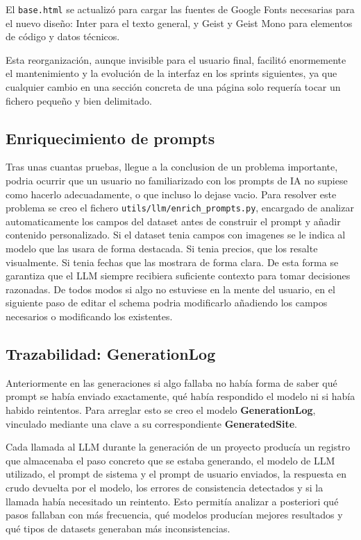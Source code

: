 El \texttt{base.html} se actualizó para cargar las fuentes de Google Fonts 
necesarias para el nuevo diseño: Inter para el texto general, 
y Geist y Geist Mono para elementos de código y datos técnicos.

Esta reorganización, aunque invisible para el usuario final, facilitó enormemente el mantenimiento y la evolución de la interfaz en los sprints siguientes, ya que cualquier cambio en una sección concreta de una página solo requería tocar un fichero pequeño y bien delimitado.


\subsection{Enriquecimiento de prompts}
\label{subsec:enriquecimiento-prompts}

Tras unas cuantas pruebas, llegue a la conclusion de un problema importante, podria ocurrir que un usuario no familiarizado con los prompts de IA no supiese como hacerlo adecuadamente, o que incluso lo dejase vacio. Para resolver este problema se creo el fichero \texttt{utils/llm/enrich\_prompts.py}, 
encargado de analizar automaticamente los campos del dataset antes de construir el prompt y añadir contenido personalizado.
Si el dataset tenia campos con imagenes se le indica al modelo que las usara de forma destacada. Si tenia precios, que los resalte visualmente. Si tenia
fechas que las mostrara de forma clara. De esta forma se garantiza que el LLM siempre recibiera suficiente contexto para tomar decisiones razonadas.
De todos modos si algo no estuviese en la mente del usuario, en el siguiente paso de editar el schema podria modificarlo añadiendo los campos necesarios o modificando los existentes.


\subsection{Trazabilidad: GenerationLog}
\label{subsec:trazabilidad-generationlog}

Anteriormente en las generaciones si algo fallaba no había forma de saber qué prompt se había enviado exactamente, qué había respondido el modelo ni si había habido reintentos. Para arreglar esto se creo el modelo \textbf{GenerationLog}, vinculado mediante una clave a su correspondiente \textbf{GeneratedSite}. 

Cada llamada al LLM durante la generación de un proyecto producía un registro que almacenaba el paso concreto que se estaba generando, el modelo de LLM utilizado, el prompt de sistema y el prompt de usuario enviados, la respuesta en crudo devuelta por el modelo, los errores de consistencia detectados y si la llamada había necesitado un reintento. Esto permitía analizar a posteriori qué pasos fallaban con más frecuencia, qué modelos producían mejores resultados y qué tipos de datasets generaban más inconsistencias.



